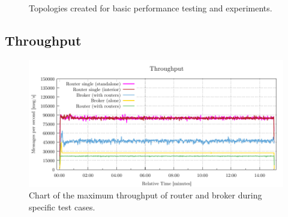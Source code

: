 \begin{figure}[h]
	\centering
	\begin{minipage}{0.45\linewidth}
	\end{minipage}
	\begin{minipage}{0.45\linewidth}
	\end{minipage}
	\caption[A simple network with active router agent.]{Topologies created for basic performance testing and experiments.}\label{fig:basic_topologies}
\end{figure}

\subsection{Throughput}
\label{Throughput}

\begin{figure}[h]
	\centering
	\includegraphics[width=1\linewidth]{obrazky-figures/charts-excel/throughput.pdf}
	\caption{Chart of the maximum throughput of router and broker during specific test cases.}
	\label{fig:max_rate}
\end{figure}

